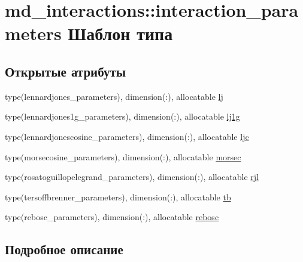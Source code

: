 \hypertarget{structmd__interactions_1_1interaction__parameters}{}\section{md\+\_\+interactions\+:\+:interaction\+\_\+parameters Шаблон типа}
\label{structmd__interactions_1_1interaction__parameters}
\subsection*{Открытые атрибуты}
\begin{DoxyCompactItemize}
\item 
type(lennardjones\+\_\+parameters), dimension(\+:), allocatable \mbox{\hyperlink{structmd__interactions_1_1interaction__parameters_a17105aae3c1c70e8e38f8df76a4d1c57}{lj}}
\item 
type(lennardjones1g\+\_\+parameters), dimension(\+:), allocatable \mbox{\hyperlink{structmd__interactions_1_1interaction__parameters_aa915e6095a7f0f3c11cd2c25cea344c9}{lj1g}}
\item 
type(lennardjonescosine\+\_\+parameters), dimension(\+:), allocatable \mbox{\hyperlink{structmd__interactions_1_1interaction__parameters_aecba06e4ab6722165fa45ccbe7bc5408}{ljc}}
\item 
type(morsecosine\+\_\+parameters), dimension(\+:), allocatable \mbox{\hyperlink{structmd__interactions_1_1interaction__parameters_a38771bf0f6c0cd4ac46151171dd2b824}{morsec}}
\item 
type(rosatoguillopelegrand\+\_\+parameters), dimension(\+:), allocatable \mbox{\hyperlink{structmd__interactions_1_1interaction__parameters_ae23b19b674151370a0cb9b6b24b8ea86}{rjl}}
\item 
type(tersoffbrenner\+\_\+parameters), dimension(\+:), allocatable \mbox{\hyperlink{structmd__interactions_1_1interaction__parameters_acb1a5443eba1a0c63403bc9e8dc73cfd}{tb}}
\item 
type(rebosc\+\_\+parameters), dimension(\+:), allocatable \mbox{\hyperlink{structmd__interactions_1_1interaction__parameters_a165970e0061960e267d6812368a16ca1}{rebosc}}
\end{DoxyCompactItemize}


\subsection{Подробное описание}


